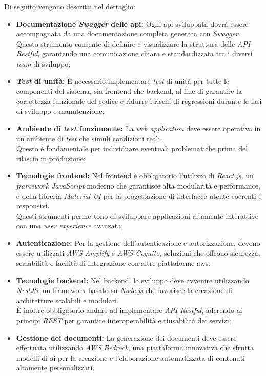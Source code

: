 \noindent Di seguito vengono descritti nel dettaglio:
\begin{itemize}
    \item \textbf{Documentazione \textit{Swagger} delle \gls{api}:} Ogni \gls{api} sviluppata dovrà essere accompagnata da una documentazione completa generata con \textit{Swagger}. \\
    Questo strumento consente di definire e visualizzare la struttura delle \textit{API Restful}, garantendo una comunicazione chiara e standardizzata tra i diversi \textit{team} di sviluppo;
    \item \textbf{\textit{Test} di unità:} È necessario implementare \textit{test} di unità per tutte le componenti del sistema, sia \gls{frontend} che \gls{backend},
    al fine di garantire la correttezza funzionale del codice e ridurre i rischi di regressioni durante le fasi di sviluppo e manutenzione;
    \item \textbf{Ambiente di \textit{test} funzionante:} La \textit{web application} deve essere operativa in un ambiente di \textit{test} che simuli condizioni reali. \\
    Questo è fondamentale per individuare eventuali problematiche prima del rilascio in produzione;
    \item \textbf{Tecnologie \gls{frontend}:} Nel \gls{frontend} è obbligatorio l’utilizzo di \textit{React.js}, un \textit{framework JavaScript} moderno che garantisce alta modularità e performance, e della libreria \textit{Material-UI} per la progettazione di interfacce utente coerenti e responsivi. \\
    Questi strumenti permettono di sviluppare applicazioni altamente interattive con una \textit{user experience} avanzata;
    \item \textbf{Autenticazione:} Per la gestione dell’autenticazione e autorizzazione, devono essere utilizzati \textit{AWS Amplify} e \textit{AWS Cognito}, soluzioni che offrono sicurezza, scalabilità e facilità di integrazione con altre piattaforme \gls{aws}.
    \item \textbf{Tecnologie \gls{backend}:} Nel \gls{backend}, lo sviluppo deve avvenire utilizzando \textit{NestJS}, un framework basato su \textit{Node.js} che favorisce la creazione di architetture scalabili e modulari. \\
    È inoltre obbligatorio andare ad implementare \textit{API Restful}, aderendo ai principi \textit{REST} per garantire interoperabilità e riusabilità dei servizi;
    \item \textbf{Gestione dei documenti:} La generazione dei documenti deve essere effettuata utilizzando \textit{AWS Bedrock}, una piattaforma innovativa che sfrutta modelli di \gls{ai} per la creazione e l’elaborazione automatizzata di contenuti altamente personalizzati. \\

\end{itemize}
